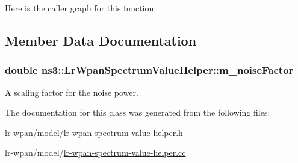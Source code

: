 Here is the caller graph for this function\+:




\subsection{Member Data Documentation}
\subsubsection[{\texorpdfstring{m\+\_\+noise\+Factor}{m_noiseFactor}}]{\setlength{\rightskip}{0pt plus 5cm}double ns3\+::\+Lr\+Wpan\+Spectrum\+Value\+Helper\+::m\+\_\+noise\+Factor\hspace{0.3cm}{\ttfamily [private]}}\hypertarget{classns3_1_1LrWpanSpectrumValueHelper_aa5ff3ee6c408d74dea64ee98743a5fac}{}\label{classns3_1_1LrWpanSpectrumValueHelper_aa5ff3ee6c408d74dea64ee98743a5fac}
A scaling factor for the noise power. 

The documentation for this class was generated from the following files\+:\begin{DoxyCompactItemize}
\item 
lr-\/wpan/model/\hyperlink{lr-wpan-spectrum-value-helper_8h}{lr-\/wpan-\/spectrum-\/value-\/helper.\+h}\item 
lr-\/wpan/model/\hyperlink{lr-wpan-spectrum-value-helper_8cc}{lr-\/wpan-\/spectrum-\/value-\/helper.\+cc}\end{DoxyCompactItemize}
